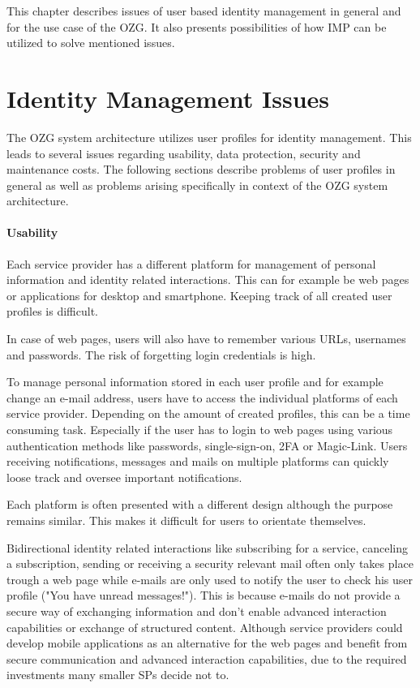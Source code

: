 This chapter describes issues of user based identity management in general and for the use case of the OZG. It also presents possibilities of how IMP can be utilized to solve mentioned issues.

\section{Identity Management Issues} \label{section:identity_management_issues}

The OZG system architecture utilizes user profiles for identity management. This leads to several issues regarding usability, data protection, security and maintenance costs. The following sections describe problems of user profiles in general as well as problems arising specifically in context of the OZG system architecture.

\paragraph{Usability}
Each service provider has a different platform for management of personal information and identity related interactions. This can for example be web pages or applications for desktop and smartphone. Keeping track of all created user profiles is difficult.

In case of web pages, users will also have to remember various URLs, usernames and passwords. The risk of forgetting login credentials is high.

To manage personal information stored in each user profile and for example change an e-mail address, users have to access the individual platforms of each service provider. Depending on the amount of created profiles, this can be a time consuming task. Especially if the user has to login to web pages using various authentication methods like passwords, single-sign-on, 2FA or Magic-Link. Users receiving notifications, messages and mails on multiple platforms can quickly loose track and oversee important notifications.

Each platform is often presented with a different design although the purpose remains similar. This makes it difficult for users to orientate themselves.

Bidirectional identity related interactions like subscribing for a service, canceling a subscription, sending or receiving a security relevant mail often only takes place trough a web page while e-mails are only used to notify the user to check his user profile ("You have unread messages!"). This is because e-mails do not provide a secure way of exchanging information and don't enable advanced interaction capabilities or exchange of structured content. Although service providers could develop mobile applications as an alternative for the web pages and benefit from secure communication and advanced interaction capabilities, due to the required investments many smaller SPs decide not to.

